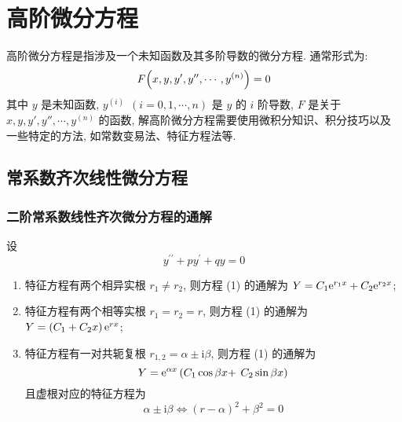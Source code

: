 \section{高阶微分方程}

高阶微分方程是指涉及一个未知函数及其多阶导数的微分方程. 通常形式为:
$$F\qty(x,y,y',y'',\cdots,y^{(n)})=0$$
其中 $y$ 是未知函数, $y^{(i)}~~(i=0,1,\cdots,n)$ 是 $y$ 的 $i$ 阶导数,
$F$ 是关于 $x,y,y',y'',\cdots,y^{(n)}$ 的函数, 解高阶微分方程需要使用微积分知识、积分技巧以及一些特定的方法, 如常数变易法、特征方程法等.

\subsection{常系数齐次线性微分方程}

\subsubsection{二阶常系数线性齐次微分方程的通解}

\begin{theorem}[二阶常系数线性齐次微分方程的通解结构]
    设
    \begin{equation*}
        y^{\prime \prime}+p y^{\prime}+q y=0
        \tag{1}
    \end{equation*}
    \begin{enumerate}[label=(\arabic{*})]
        \item 特征方程有两个相异实根 $ r_{1} \neq r_{2}$, 则方程 (1) 的通解为 $ Y=C_{1} \mathrm{e}^{r_{1} x}+C_{2} \mathrm{e}^{r_{2} x} $;
        \item 特征方程有两个相等实根 $ r_{1}=r_{2}=r $, 则方程 (1) 的通解为 $ Y=\left(C_{1}+C_{2} x\right) \mathrm{e}^{r x} $;
        \item 特征方程有一对共轭复根 $ r_{1,2}=\alpha \pm \mathrm{i} \beta $, 则方程 (1) 的通解为
              $$Y=\mathrm{e}^{\alpha x}\left(C_{1} \cos \beta x+\right.   \left.C_{2} \sin \beta x\right) $$
              且虚根对应的特征方程为 $$
                  \alpha \pm \mathrm{i} \beta \Leftrightarrow (r-\alpha)^2+\beta^2=0
              $$
    \end{enumerate}
\end{theorem}

